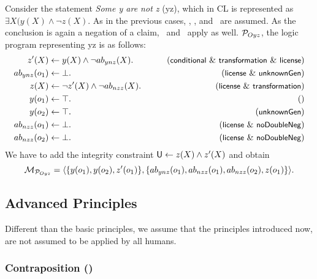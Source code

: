 \documentclass[12pt]{article}
\begin{document}
Consider the statement \textit{Some y are not z} ({\MO yz}), which in CL is represented as $\exists X (y(X) \wedge \neg z(X)$.
As in the previous cases, \conditionals, \licenses, and \unknownGen\ are assumed.
As the conclusion is again a negation of a claim, \transformation\ and
\dnegation\ apply as well. ${\cal P}_{Oyz}$, the logic program representing \MO yz is as follows:
\begin{align}
z'(X) & \leftarrow y(X) \wedge \neg \Ab_{ynz}(X). & \tag{\conditionals\ \&\ \transformation \ \&\ \licenses} \\
\Ab_{ynz}(o_1) & \leftarrow \bot. & \tag{\licenses\ \& \unknownGen} \\
z(X) & \leftarrow  \neg z'(X) \wedge \neg \Ab_{nzz}(X). &
\tag{\licenses\ \&\ \transformation} \\
y(o_1) & \leftarrow \top. & \tag{} \\
y(o_2) & \leftarrow \top. & \tag{\unknownGen} \\
\Ab_{nzz}(o_1)& \leftarrow \bot. & \tag{\licenses\ \&\ \dnegation}\\
\Ab_{nzz}(o_2)& \leftarrow \bot. & \tag{\licenses\ \&\ \dnegation}
\end{align}
We have to add the integrity constraint $\mathsf{U} \leftarrow z(X) \wedge
z'(X)$
and obtain \[{\cal M}_{{\cal P}_{Oyz}} = \langle \{y(o_1), y(o_2), z'(o_1)\},\{ab_{ynz}(o_1),
ab_{nzz}(o_1), ab_{nzz}(o_2), z(o_1) \} \rangle.\]


\subsection{Advanced Principles}\label{sect:advanced}
Different than the basic principles, we assume that the principles introduced now, are not assumed to be applied by all humans.


\subsubsection{Contraposition (\contraposition)}
\end{document}
